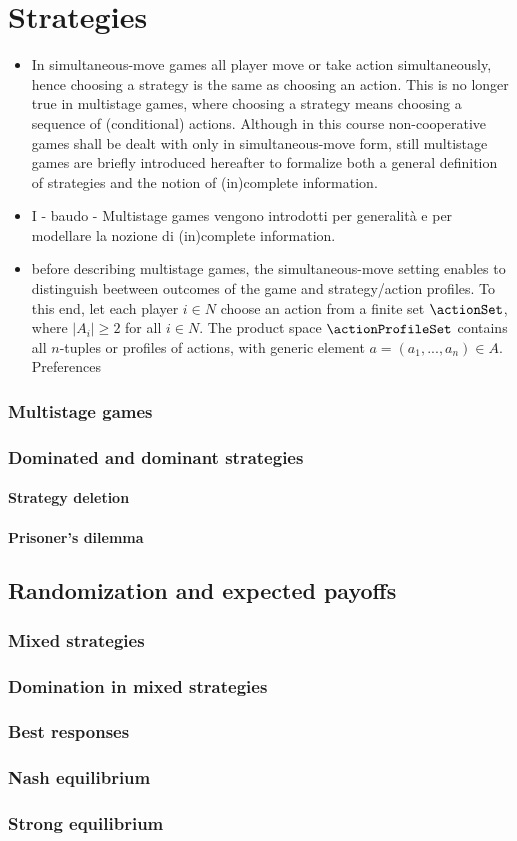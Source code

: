 \chapter{Strategies}
\begin{itemize}
	\item In simultaneous-move games all player move or take action simultaneously, hence choosing a strategy is the same as choosing an action. This is no longer true in multistage games, where choosing a strategy means choosing a sequence of (conditional) actions. Although in this course non-cooperative games shall be dealt with only in simultaneous-move form, still multistage games are briefly introduced hereafter to formalize both a general definition of strategies and the notion of (in)complete information.
	\item I - baudo - Multistage games vengono introdotti per generalit\`a e per modellare la nozione di (in)complete information.
	\item before describing multistage games, the simultaneous-move setting enables to distinguish beetween outcomes of the game and strategy/action profiles. To this end, let each player $i \in N$ choose an action from a finite set $\actionSet$, where $|A_i| \ge 2$ for all $i \in N$. The product space $\actionProfileSet$ contains all $n$-tuples or profiles of actions, with generic element $a = (a_1, ..., a_n) \in A$. Preferences  
\end{itemize}


\subsection{Multistage games}
\subsection{Dominated and dominant strategies}
\subsubsection{Strategy deletion}
\subsubsection{Prisoner's dilemma}

\section{Randomization and expected payoffs}
\subsection{Mixed strategies}
\subsection{Domination in mixed strategies}
\subsection{Best responses}
\subsection{Nash equilibrium}
\subsection{Strong equilibrium}